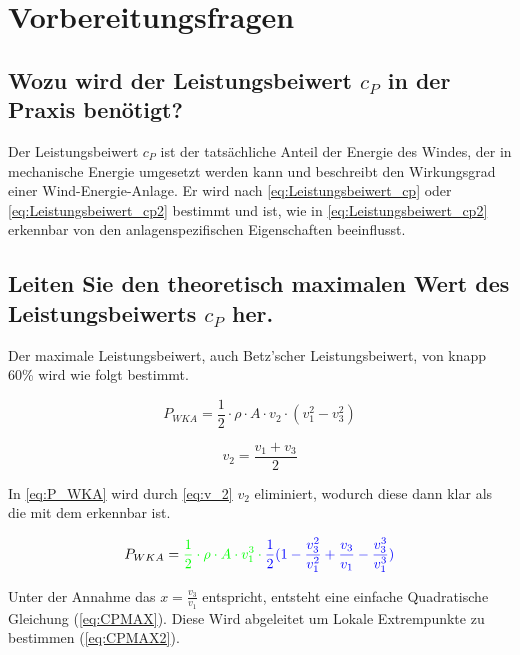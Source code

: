 \section{Vorbereitungsfragen}
\subsection{Wozu wird der Leistungsbeiwert \texorpdfstring{$c_P$}{} in der Praxis benötigt?}
Der Leistungsbeiwert $c_P$ ist der tatsächliche Anteil der Energie des Windes, der in mechanische Energie umgesetzt werden kann und beschreibt den Wirkungsgrad einer Wind-Energie-Anlage. Er wird nach \ref{eq:Leistungsbeiwert_cp} oder \ref{eq:Leistungsbeiwert_cp2} bestimmt und ist, wie in \ref{eq:Leistungsbeiwert_cp2} erkennbar von den anlagenspezifischen Eigenschaften beeinflusst.



\subsection{Leiten Sie den theoretisch maximalen Wert des Leistungsbeiwerts \texorpdfstring{$c_P$}{} her.}
Der maximale Leistungsbeiwert, auch Betz'scher Leistungsbeiwert, von knapp 60\% wird wie folgt bestimmt.

\begin{equation}
P_{WKA}= \frac{1}{2} \cdot \rho \cdot A \cdot v_2 \cdot (v_1^2 - v_3^2)
\label{eq:P_WKA} 
\end{equation}

\begin{equation}
v_2= \frac{v_1+v_3}{2} 
\label{eq:v_2} 
\end{equation}

In \ref{eq:P_WKA} wird durch \ref{eq:v_2} $v_2$ eliminiert, wodurch diese dann klar als die \color{green}{Leistung des Windes} mit dem \color{blue}{Leistungsbeiwert} erkennbar ist. 

\begin{equation}
P_{WKA}= \color{green}{\frac{1}{2} \cdot \rho \cdot A \cdot v_1^3 } \cdot \color{blue}{\frac{1}{2} (1-\frac{v_3^2}{v_1^2} + \frac{v_3}{v_1} - \frac{v_3^3}{v_1^3}})
\label{eq:P_WKA2} 
\end{equation}

\color{black}{}

Unter der Annahme das $x=\frac{v_3}{v_1}$ entspricht, entsteht eine einfache Quadratische Gleichung (\ref{eq:CPMAX}). Diese Wird abgeleitet um Lokale Extrempunkte zu bestimmen (\ref{eq:CPMAX2}). 

